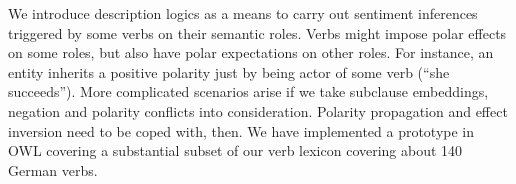 We introduce description logics as a means to carry out  sentiment inferences triggered by some verbs on their semantic roles. Verbs might impose polar effects on some roles, but also have polar expectations on other roles. For instance, an entity inherits a positive polarity just by being actor of some verb (``she succeeds''). More complicated scenarios arise if we take subclause embeddings, negation and polarity conflicts into consideration. Polarity propagation and effect inversion need to be coped with, then. We have implemented a prototype in OWL covering a substantial subset of our  verb lexicon covering about 140 German verbs.
